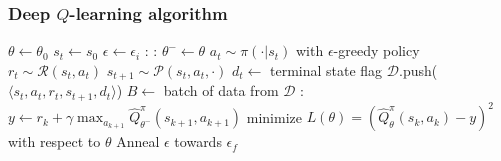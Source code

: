 \documentclass{beamer}
\begin{document}
\begin{frame}
  \frametitle{Deep $Q$-learning algorithm}
  \begin{algorithmic}[1]
    \State $\theta \gets \theta_0$
    \State $s_t \gets s_0$
    \State $\epsilon \gets \epsilon_i$
     :
    :
      \State $\theta^- \gets \theta$
    \EndIf
      \State $a_t \sim \pi(\cdot \vert s_t)$ with $\epsilon$-greedy policy
      \State $r_t \sim \mathcal{R}(s_t, a_t)$
      \State $s_{t+1} \sim \mathcal{P}(s_t, a_t, \cdot)$
      \State $d_t \gets $ terminal state flag
      \State $\mathcal{D}$.push($\langle s_t, a_t, r_t, s_{t+1}, d_t \rangle$)
      \State $B \gets $ batch of data from $\mathcal{D}$
      :
        \State $y \gets r_k + \gamma \max_{a_{k+1}} \widehat{Q}_{\theta^-}^\pi (s_{k+1}, a_{k+1})$
        \State minimize $L(\theta) = \left( \widehat{Q}_{\theta}^\pi(s_k, a_k) - y \right) ^2$ with respect to $\theta$
      \EndFor
      \State Anneal $\epsilon$ towards $\epsilon_f$
    \EndFor
  \end{algorithmic}
\end{frame}
\end{document}
